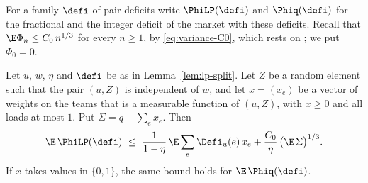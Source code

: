 For a family $\defi$ of pair deficits write $\PhiLP(\defi)$ and $\Phiq(\defi)$ for the
fractional and the integer deficit of the market with these deficits. Recall that
$\E\Phi_n\le C_0\,n^{1/3}$ for every $n\ge1$, by \eqref{eq:variance-C0}, which rests on
\cite[Theorem~2(b)]{FPT20}; we put $\Phi_0=0$.

\begin{lemma}\label{lem:lp-patch}
Let $u$, $w$, $\eta$ and $\defi$ be as in Lemma~\ref{lem:lp-split}. Let $Z$ be a random
element such that the pair $(u,Z)$ is independent of $w$, and let $x=(x_e)$ be a vector of
weights on the teams that is a measurable function of $(u,Z)$, with $x\ge0$ and all loads at
most $1$. Put $\Sigma=q-\sum_ex_e$. Then
\begin{equation}\label{eq:lp-patch}
\E\,\PhiLP(\defi)\ \le\ \frac1{1-\eta}\,\E\sum_e\Defi_u(e)\,x_e+\frac{C_0}{\eta}\,
\bigl(\E\,\Sigma\bigr)^{1/3}.
\end{equation}
If $x$ takes values in $\{0,1\}$, the same bound holds for $\E\,\Phiq(\defi)$.
\end{lemma}

